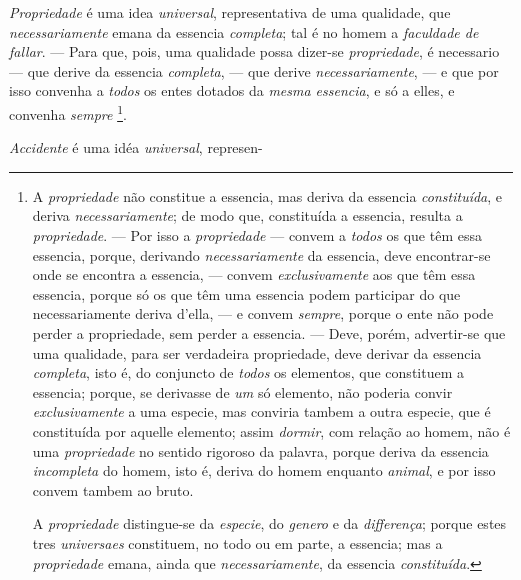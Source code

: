
 
\emph{Propriedade} é uma idea \emph{universal}, representativa de uma qualidade, que \emph{necessariamente} emana da essencia \emph{completa}; tal é no homem a \emph{faculdade de fallar}. --- Para que, pois, uma qualidade possa dizer-se \emph{propriedade}, é necessario --- que derive da essencia \emph{completa}, --- que derive \emph{necessariamente}, --- e que por isso convenha a \emph{todos} os entes dotados da \emph{mesma essencia}, e só a elles, e convenha \emph{sempre} \footnote{A \emph{propriedade} não constitue a essencia, mas deriva da essencia \emph{constituída}, e deriva \emph{necessariamente}; de modo que, constituída a essencia, resulta a \emph{propriedade}. --- Por isso a \emph{propriedade} --- convem a \emph{todos} os que têm essa essencia, porque, derivando \emph{necessariamente} da essencia, deve encontrar-se onde se encontra a essencia, --- convem \emph{exclusivamente} aos que têm essa essencia, porque só os que têm uma essencia podem participar do que necessariamente deriva d'ella, --- e convem \emph{sempre}, porque o ente não pode perder a propriedade, sem perder a essencia. --- Deve, porém, advertir-se que uma qualidade, para ser verdadeira propriedade, deve derivar da essencia \emph{completa}, isto é, do conjuncto de \emph{todos} os elementos, que constituem a essencia; porque, se derivasse de \emph{um} só elemento, não poderia convir \emph{exclusivamente} a uma especie, mas conviria tambem a outra especie, que é constituída por aquelle elemento; assim \emph{dormir}, com relação ao homem, não é uma \emph{propriedade} no sentido rigoroso da palavra, porque deriva da essencia \emph{incompleta} do homem, isto é, deriva do homem enquanto \emph{animal}, e por isso convem tambem ao bruto.\par A \emph{propriedade} distingue-se da \emph{especie}, do \emph{genero} e da \emph{differença}; porque estes tres \emph{universaes} constituem, no todo ou em parte, a essencia; mas a \emph{propriedade} emana, ainda que \emph{necessariamente}, da essencia \emph{constituída}.}.


\emph{Accidente} é uma idéa \emph{universal}, represen- 


